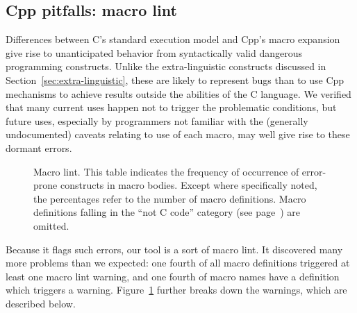 \documentclass[10pt]{article}
\newcommand{\captionsmall}[1]{\caption[]{\small #1}}
\begin{document}
\begin{description}
\end{description}



\subsection{Cpp pitfalls:  macro lint}
\label{sec:lint}

Differences between C's standard execution model and Cpp's macro expansion
give rise to unanticipated behavior from syntactically valid dangerous
programming constructs.  Unlike the extra-linguistic constructs discussed
in Section~\ref{sec:extra-linguistic}, these are likely to represent bugs
than to use Cpp mechanisms to achieve results outside the abilities of the
C language.  We verified that many current uses happen not to trigger the
problematic conditions, but future uses, especially by programmers not
familiar with the (generally undocumented) caveats relating to use of each
macro, may well give rise to these dormant errors.

\begin{figure}
  {\small\centerline{}}
  
  \captionsmall{Macro lint.  This table indicates the frequency of occurrence of
    error-prone constructs in macro bodies.  Except where specifically
    noted, the percentages refer to the number of macro definitions.  Macro
    definitions falling in the ``not C code'' category (see
    page~\pageref{page:not-c-code}) are omitted.}
  \label{fig:macro-lint}
\end{figure}

Because it flags such errors, our tool is a sort of macro lint.
It discovered many more problems than we expected: one fourth of all macro
definitions triggered at least one macro lint warning, and one fourth of
macro names have a definition which triggers a warning.
Figure~\ref{fig:macro-lint} further breaks down the warnings, which are
described below.
\end{document}
